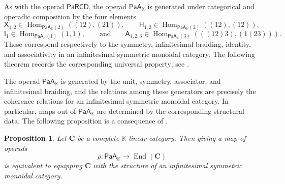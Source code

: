 \documentclass{amsart}
\newcommand{\bC}{\mathbf{C}}
\newcommand{\kk}{\mathbb{K}}    %
\newcommand{\PaA}{\mathsf{PaA}}
\newcommand{\PaRCD}{\mathsf{PaRCD}}
\newcommand{\A}{\mathsf{A}}
\newcommand{\magma}{\Omega}
\newcommand{\hA}{{\A}_{\kk}}
\newcommand{\hPaA}{{\PaA}_{\kk}}
\newcommand{\End}{\operatorname{End}}
\newcommand{\Hom}{\operatorname{Hom}}
\newcommand{\ob}{\operatorname{ob}}
\newcommand{\lrar}{\ensuremath{\longrightarrow}}
\newtheorem{prop}[theorem]{Proposition}%
\theoremstyle{definition}
\numberwithin{equation}{section}
\begin{document}
As with the operad $\PaRCD$, the operad $\hPaA$ is generated under categorical and operadic composition by the four elements
\[
\textsf{X}_{1,2}\in \Hom_{\hPaA(2)}((12),(21)), \qquad
\textsf{H}_{1,2}\in \Hom_{\hPaA(2)}((12),(12)),
\]
\[
\textsf{I}_1\in \Hom_{\hPaA(1)}(1,1), \qquad \text{and} \qquad
\textsf{A}_{1,2,3}\in \Hom_{\hPaA(3)}(((12)3),(1(23))).
\]
These correspond respectively to the symmetry, infinitesimal braiding, identity, and associativity in an infinitesimal symmetric monoidal category. The following theorem records the corresponding universal property; see \cite[Theorem~10.3.4]{FresseBook1}.



The operad $\hPaA$ is generated by the unit, symmetry, associator, and infinitesimal braiding, and the relations among these generators are precisely the coherence relations for an infinitesimal symmetric monoidal category. In particular, maps out of $\hPaA$ are determined by the corresponding structural data. The following proposition is a consequence of \cite[Theorem~10.3.4]{FresseBook1}.

\begin{prop}\label{prop: hPaA-structure-is-inf-sym}
Let $\bC$ be a complete $\kk$-linear category. Then giving a map of operads
\[
\rho\colon \hPaA\to \End(\bC)
\]
is equivalent to equipping $\bC$ with the structure of an infinitesimal symmetric monoidal category.
\end{prop}
\end{document}
